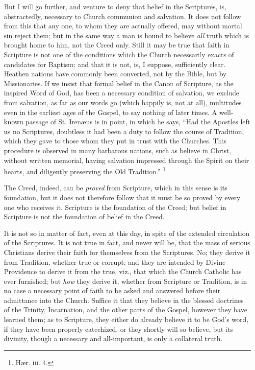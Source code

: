 But I will go further, and venture to deny that belief in the
Scriptures, is, abstractedly, necessary to Church communion and
salvation. It does not follow from this that any one, to whom they are
actually offered, may without mortal sin reject them; but in the same
way a man is bound to believe \emph{all} truth which is brought home
to him, not the Creed only. Still it may be true that faith in
Scripture is not one of the conditions which the Church necessarily
exacts of candidates for Baptism; and that it is not, is, I suppose,
sufficiently clear. Heathen nations have commonly been converted, not
by the Bible, but by Missionaries. If we insist that formal belief in
the Canon of Scripture, as the inspired Word of God, has been a
necessary condition of salvation, we exclude from salvation, as
far as our words go (which happily is, not at all), multitudes even in
the earliest ages of the Gospel, to say nothing of later times. A
well-known passage of St. Irenæus is in point, in which he says,
``Had the Apostles left us no Scriptures, doubtless it had been a
duty to follow the course of Tradition, which they gave to those whom
they put in trust with the Churches. This procedure is observed in
many barbarous nations, such as believe in Christ, without written
memorial, having salvation impressed through the Spirit on their
hearts, and diligently preserving the Old Tradition.'' \footnote{Hær. iii. 4.}

The Creed, indeed, can be \emph{proved} from Scripture, which in
this sense is its foundation, but it does not therefore follow that it
must be so proved by every one who receives it. Scripture is the
foundation of the Creed; but belief in Scripture is not the foundation
of belief in the Creed.

It is not so in matter of fact, even at this day, in spite of the
extended circulation of the Scriptures. It is not true in fact, and
never will be, that the mass of serious Christians derive their faith
for themselves from the Scriptures. No; they derive it from Tradition,
whether true or corrupt; and they are intended by Divine Providence to
derive it from the true, viz., that which the Church Catholic has ever
furnished; but \emph{how} they derive it, whether from Scripture or
Tradition, is in no case a necessary point of faith to be asked and
answered before their admittance into the Church. Suffice it that they
believe in the blessed doctrines of the Trinity, Incarnation, and the
other parts of the Gospel, however they have learned them; as to
Scripture, they either do already believe it to be God's word, if they
have been properly catechized, or they shortly will so believe, but
its divinity, though a necessary and all-important, is only a
collateral truth.

